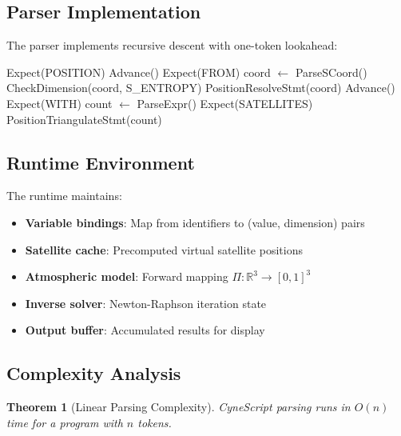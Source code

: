 \documentclass[twocolumn,10pt,a4paper]{article}
\newtheorem{theorem}{Theorem}[section]
\theoremstyle{definition}
\theoremstyle{remark}
\begin{document}
\subsection{Parser Implementation}

The parser implements recursive descent with one-token lookahead:

\begin{algorithm}[H]
\caption{Parse Position Statement}
\label{alg:parse_pos}
\begin{algorithmic}[1]
    \STATE Expect(POSITION)
        \STATE Advance()
        \STATE Expect(FROM)
        \STATE coord $\gets$ ParseSCoord()
        \STATE CheckDimension(coord, S\_ENTROPY)
        \RETURN PositionResolveStmt(coord)
        \STATE Advance()
        \STATE Expect(WITH)
        \STATE count $\gets$ ParseExpr()
        \STATE Expect(SATELLITES)
        \RETURN PositionTriangulateStmt(count)
    \ENDIF
\ENDFUNCTION
\end{algorithmic}
\end{algorithm}

\subsection{Runtime Environment}

The runtime maintains:
\begin{itemize}
    \item \textbf{Variable bindings}: Map from identifiers to (value, dimension) pairs
    \item \textbf{Satellite cache}: Precomputed virtual satellite positions
    \item \textbf{Atmospheric model}: Forward mapping $\Pi: \mathbb{R}^3 \to [0,1]^3$
    \item \textbf{Inverse solver}: Newton-Raphson iteration state
    \item \textbf{Output buffer}: Accumulated results for display
\end{itemize}

\subsection{Complexity Analysis}

\begin{theorem}[Linear Parsing Complexity]
\label{thm:parsing}
CyneScript parsing runs in $O(n)$ time for a program with $n$ tokens.
\end{theorem}
\end{document}
